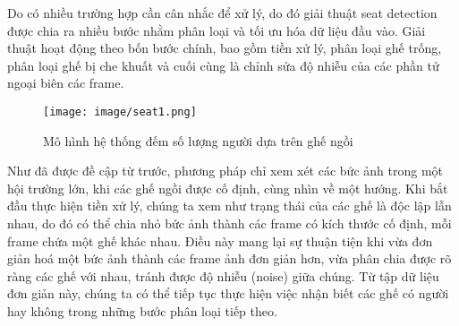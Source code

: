 \documentclass[12pt,a4paper]{article}
\begin{document}
Do có nhiều trường hợp cần cân nhắc để xử lý, do đó giải thuật seat detection được chia ra nhiều bước nhằm phân loại và tối ưu hóa dữ liệu đầu vào. Giải thuật hoạt động theo bốn bước chính, bao gồm tiền xử lý, phân loại ghế trống, phân loại ghế bị che khuất và cuối cùng là chỉnh sửa độ nhiễu của các phần tử ngoại biên các frame.


		        \begin{figure}[H]
		            \centering
		            \texttt{[image: image/seat1.png]}
		            \caption{Mô hình hệ thống đếm số lượng người dựa trên ghế ngồi \cite{Seat Detection}}
		            \label{fig:my_label}
		        \end{figure}

Như đã được đề cập từ trước, phương pháp chỉ xem xét các bức ảnh trong một hội trường lớn, khi các ghế ngồi được cố định, cùng nhìn về một hướng. Khi bắt đầu thực hiện tiền xử lý, chúng ta xem như trạng thái của các ghế là độc lập lẫn nhau, do đó có thể chia nhỏ bức ảnh thành các frame có kích thước cố định, mỗi frame chứa một ghế khác nhau. Điều này mang lại sự thuận tiện khi vừa đơn giản hoá một bức ảnh thành các frame ảnh đơn giản hơn, vừa phân chia được rõ ràng các ghế với nhau, tránh được độ nhiễu (noise) giữa chúng. Từ tập dữ liệu đơn giản này, chúng ta có thể tiếp tục thực hiện việc nhận biết các ghế có người hay không trong những bước phân loại tiếp theo. \\ \\
\end{document}
